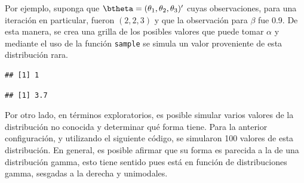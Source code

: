 Por ejemplo, suponga que $\btheta=(\theta_1, \theta_2, \theta_3)'$ cuyas observaciones, para una iteración en particular, fueron $(2, 2, 3)$ y que la observación para $\beta$ fue 0.9. De esta manera, se crea una grilla de los posibles valores que puede tomar $\alpha$ y mediante el  uso de la función \verb'sample' se simula un valor proveniente de esta distribución rara.

\begin{knitrout}
\color{fgcolor}\begin{kframe}
\begin{alltt}
  \hlkwb{<-} \hlstd{(}\hlstd{,} \hlstd{,} \hlstd{=}\hlstd{)}
  \hlkwb{<-} 
  \hlkwb{<-} 
  \hlkwb{<-} 
  \hlkwb{<-} \hlstd{(}\hlstd{,}\hlstd{,}\hlstd{)}

  \hlkwb{<-} \hlstd{()}
   \hlopt{:}
   \hlkwb{<-} 
 \hlstd{\}}
  \hlkwb{<-} 
  \hlkwb{<-} \hlopt{/}
\end{alltt}
\begin{verbatim}
## [1] 1
\end{verbatim}
\begin{alltt}
  \hlkwb{<-}  \hlstd{,}  \hlstd{=}\hlstd{)}
  \hlkwb{<-} 
\end{alltt}
\begin{verbatim}
## [1] 3.7
\end{verbatim}
\end{kframe}
\end{knitrout}

Por otro lado, en términos exploratorios, es posible simular varios valores de la distribución no conocida y determinar qué forma tiene. Para la anterior configuración, y utilizando el siguiente código, se simularon 100 valores de esta distribución. En general, es posible afirmar que su forma es parecida a la de una distribución gamma, esto tiene sentido pues está en función de distribuciones gamma, sesgadas a la derecha y unimodales.

